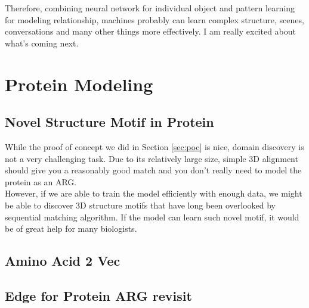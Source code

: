 Therefore, combining neural network for individual object and pattern learning for modeling relationship, machines probably can learn complex structure, scenes, conversations and many other things more effectively. I am really excited about what's coming next.

\section{Protein Modeling}

\subsection{Novel Structure Motif in Protein}

While the proof of concept we did in Section \ref{sec:poc} is nice, domain discovery is not a very challenging task. Due to its relatively large size, simple 3D alignment should give you a reasonably good match and you don't really need to model the protein as an ARG.\\

However, if we are able to train the model efficiently with enough data, we might be able to discover 3D structure motifs that have long been overlooked by sequential matching algorithm. If the model can learn such novel motif, it would be of great help for many biologists.

\subsection{Amino Acid 2 Vec}



\subsection{Edge for Protein ARG revisit}
